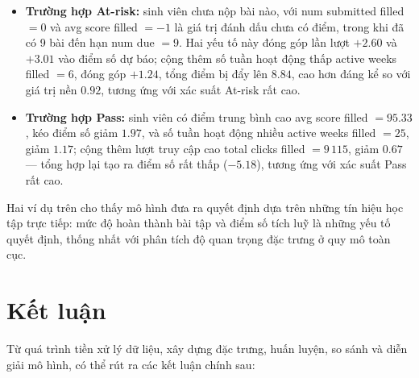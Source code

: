 \documentclass[a4paper]{report}
\newcommand{\code}[1]{{\ttfamily\def\_{\textunderscore\discretionary{}{}{}}#1}}
\def\code#1{#1}%
\def\_{ }%
\begin{document}
\begin{itemize}[leftmargin=*]
  \item \textbf{Trường hợp At-risk:} sinh viên chưa nộp bài nào, với
        \code{num\_submitted\_filled} $= 0$ và \code{avg\_score\_filled} $= -1$
        là giá trị đánh dấu chưa có điểm, trong khi đã có 9 bài đến hạn
        \code{num\_due} $= 9$. Hai yếu tố này đóng góp lần lượt $+2.60$ và
        $+3.01$ vào điểm số dự báo; cộng thêm số tuần hoạt động thấp
        \code{active\_weeks\_filled} $= 6$, đóng góp $+1.24$, tổng điểm bị
        đẩy lên $8.84$, cao hơn đáng kể so với giá trị nền $0.92$, tương ứng
        với xác suất At-risk rất cao.
  \item \textbf{Trường hợp Pass:} sinh viên có điểm trung bình cao
        \code{avg\_score\_filled} $= 95.33$, kéo điểm số giảm $1.97$, và số
        tuần hoạt động nhiều \code{active\_weeks\_filled} $= 25$, giảm
        $1.17$; cộng thêm lượt truy cập cao
        \code{total\_clicks\_filled} $= 9\,115$, giảm $0.67$ --- tổng hợp
        lại tạo ra điểm số rất thấp ($-5.18$), tương ứng với xác suất Pass rất
        cao.
\end{itemize}

Hai ví dụ trên cho thấy mô hình đưa ra quyết định dựa trên những tín hiệu học
tập trực tiếp: mức độ hoàn thành bài tập và điểm số tích luỹ là những yếu tố
quyết định, thống nhất với phân tích độ quan trọng đặc trưng ở quy mô toàn cục.

\chapter*{Kết luận}

Từ quá trình tiền xử lý dữ liệu, xây dựng đặc trưng, huấn luyện, so sánh và
diễn giải mô hình, có thể rút ra các kết luận chính sau:
\end{document}
